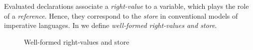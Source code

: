 {Evaluated declarations associate a \emph{right-value} to a variable, which plays the role of a \emph{reference}.
{Hence, they correspond to} the \emph{store} in conventional models of imperative languages.}
In  we define {\em {well-formed} right-values and store}. 
\begin{figure}[ht]
\caption{Well-formed right-values and store}\label{fig:wellformed}
\end{figure}

